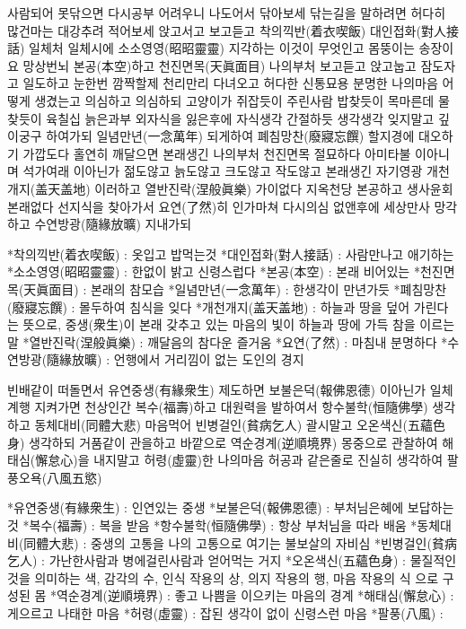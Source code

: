 \documentclass[12pt, a4paper, oneside]{book}
\begin{document}
 사람되어 못닦으면 다시공부 어려우니 나도어서 닦아보세 닦는길을 말하려면 허다히 많건마는 대강추려 적어보세 앉고서고 보고듣고 착의끽반(着衣喫飯) 대인접화(對人接話) 일체처 일체시에 소소영영(昭昭靈靈) 지각하는 이것이 무엇인고 몸뚱이는 송장이요 망상번뇌 본공(本空)하고 천진면목(天眞面目) 나의부처 보고듣고 앉고눕고 잠도자고 일도하고 눈한번 깜짝할제 천리만리 다녀오고 허다한 신통묘용 분명한 나의마음 어떻게 생겼는고 의심하고 의심하되 고양이가 쥐잡듯이 주린사람 밥찾듯이 목마른데 물찾듯이 육칠십 늙은과부 외자식을 잃은후에 자식생각 간절하듯 생각생각 잊지말고 깊이궁구 하여가되 일념만년(一念萬年) 되게하여 폐침망찬(廢寢忘饌) 할지경에 대오하기 가깝도다 홀연히 깨달으면 본래생긴 나의부처 천진면목 절묘하다 아미타불 이아니며 석가여래 이아닌가 젊도않고 늙도않고 크도않고 작도않고 본래생긴 자기영광 개천개지(盖天盖地) 이러하고 열반진락(涅般眞樂) 가이없다 지옥천당 본공하고 생사윤회 본래없다 선지식을 찾아가서 요연(了然)히 인가마쳐 다시의심 없앤후에 세상만사 망각하고 수연방광(隨緣放曠) 지내가되

*착의끽반(着衣喫飯) : 옷입고 밥먹는것
*대인접화(對人接話) : 사람만나고 애기하는
*소소영영(昭昭靈靈) : 한없이 밝고 신령스럽다
*본공(本空) : 본래 비어있는
*천진면목(天眞面目) : 본래의 참모습
*일념만년(一念萬年) : 한생각이 만년가듯
*폐침망찬(廢寢忘饌) : 몰두하여 침식을 잊다
*개천개지(盖天盖地) : 하늘과 땅을 덮어 가린다는 뜻으로, 중생(衆生)이 본래 갖추고 있는 마음의 빛이 하늘과 땅에 가득 참을 이르는 말
*열반진락(涅般眞樂) : 깨달음의 참다운 즐거움
*요연(了然) : 마침내 분명하다
*수연방광(隨緣放曠) : 언행에서 거리낌이 없는 도인의 경지

빈배같이 떠돌면서 유연중생(有緣衆生) 제도하면 보불은덕(報佛恩德) 이아닌가 일체계행 지켜가면 천상인간 복수(福壽)하고 대원력을 발하여서 항수불학(恒隨佛學) 생각하고 동체대비(同體大悲) 마음먹어 빈병걸인(貧病乞人) 괄시말고 오온색신(五蘊色身) 생각하되 거품같이 관을하고 바깥으로 역순경계(逆順境界) 몽중으로 관찰하여 해태심(懈怠心)을 내지말고 허령(虛靈)한 나의마음 허공과 같은줄로 진실히 생각하여 팔풍오욕(八風五慾)

 

*유연중생(有緣衆生) : 인연있는 중생
*보불은덕(報佛恩德) : 부처님은혜에 보답하는것
*복수(福壽) : 복을 받음
*항수불학(恒隨佛學) : 항상 부처님을 따라 배움
*동체대비(同體大悲) : 중생의 고통을 나의 고통으로 여기는 불보살의 자비심
*빈병걸인(貧病乞人) : 가난한사람과 병에걸린사람과 얻어먹는 거지
*오온색신(五蘊色身) : 물질적인 것을 의미하는 색, 감각의 수, 인식 작용의 상, 의지 작용의 행, 마음 작용의 식 으로 구성된 몸
*역순경계(逆順境界) : 좋고 나쁨을 이으키는 마음의 경계
*해태심(懈怠心) : 게으르고 나태한 마음
*허령(虛靈) : 잡된 생각이 없이 신령스런 마음
*팔풍(八風) :
\end{document}
